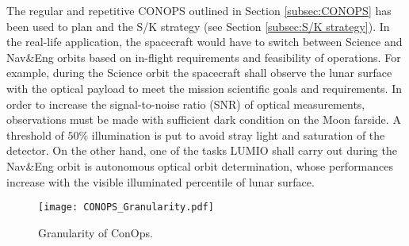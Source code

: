The regular and repetitive {CONOPS} outlined in Section \ref{subsec:CONOPS} has been used to plan and the S/K strategy (see Section \ref{subsec:S/K strategy}). In the real-life application, the spacecraft would have to switch between Science and Nav\&Eng orbits based on in-flight requirements and feasibility of operations. For example, during the Science orbit the spacecraft shall observe the lunar surface with the optical payload to meet the mission scientific goals and requirements. In order to increase the signal-to-noise ratio (SNR) of optical measurements, observations must be made with sufficient dark condition on the Moon farside. A threshold of $50\%$ illumination is put to avoid stray light and saturation of the detector. On the other hand, one of the tasks LUMIO shall carry out during the Nav\&Eng orbit is autonomous optical orbit determination, whose performances increase with the visible illuminated percentile of lunar surface.
%
\begin{figure*}[t!]
	\centering
	\texttt{[image: CONOPS\_Granularity.pdf]}
	\caption{Granularity of ConOps.}
	\label{fig:CONOPS_Granularity}
\end{figure*}
%

